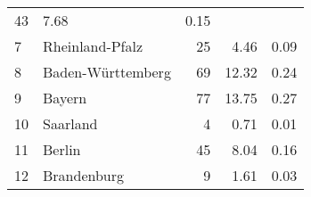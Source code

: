 \begin{longtable}{lXrrr}
       \num{43} &
       \num[round-mode=places,round-precision=2]{7.68} &
         \num[round-mode=places,round-precision=2]{0.15} \\

     7 &
     \multicolumn{1}{X}{ Rheinland-Pfalz   } &


       \num{25} &
       \num[round-mode=places,round-precision=2]{4.46} &
         \num[round-mode=places,round-precision=2]{0.09} \\

     8 &
     \multicolumn{1}{X}{ Baden-Württemberg   } &


       \num{69} &
       \num[round-mode=places,round-precision=2]{12.32} &
         \num[round-mode=places,round-precision=2]{0.24} \\

     9 &
     \multicolumn{1}{X}{ Bayern   } &


       \num{77} &
       \num[round-mode=places,round-precision=2]{13.75} &
         \num[round-mode=places,round-precision=2]{0.27} \\

     10 &
     \multicolumn{1}{X}{ Saarland   } &


       \num{4} &
       \num[round-mode=places,round-precision=2]{0.71} &
         \num[round-mode=places,round-precision=2]{0.01} \\

     11 &
     \multicolumn{1}{X}{ Berlin   } &


       \num{45} &
       \num[round-mode=places,round-precision=2]{8.04} &
         \num[round-mode=places,round-precision=2]{0.16} \\

     12 &
     \multicolumn{1}{X}{ Brandenburg   } &


       \num{9} &
       \num[round-mode=places,round-precision=2]{1.61} &
         \num[round-mode=places,round-precision=2]{0.03} \\


\end{longtable}
